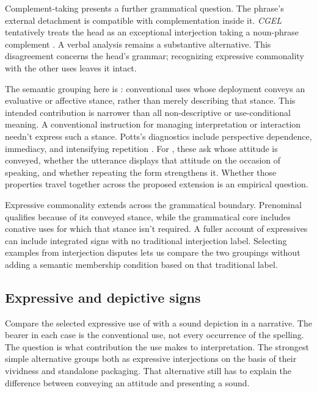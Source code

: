 \documentclass[12pt]{article}
\begin{document}
Complement-taking  presents a further
grammatical question. The phrase's external detachment is compatible with
complementation inside it. \textit{CGEL} tentatively treats the head as
an exceptional interjection taking a noun-phrase complement
\citep[1361 n.~70]{HuddlestonPullum2002}. A verbal analysis remains a
substantive alternative. This disagreement concerns the head's grammar;
recognizing expressive commonality with the other  uses
leaves it intact.

The semantic grouping here is : conventional uses
whose deployment conveys an evaluative or affective stance, rather than
merely describing that stance. This intended contribution is narrower than
all non-descriptive or use-conditional meaning. A conventional instruction
for managing interpretation or interaction needn't express such a stance.
Potts's diagnostics include perspective dependence, immediacy, and
intensifying repetition \citep[166--167]{potts2007}. For ,
these ask whose attitude is conveyed, whether the utterance displays
that attitude on the occasion of speaking, and whether repeating the
form strengthens it. Whether those properties travel together across
the proposed extension is an empirical question.

Expressive commonality extends across the grammatical boundary. Prenominal
 qualifies because of its conveyed stance, while the
grammatical core includes conative uses for which that stance isn't
required. A fuller account of expressives can include integrated signs
with no traditional interjection label. Selecting examples from interjection
disputes lets us compare the two groupings without adding a semantic
membership condition based on that traditional label.

\subsection{Expressive and depictive signs}\label{sec:expressive-depictive}

Compare the selected expressive use of  with a sound depiction
 in a narrative. The bearer in each case is the conventional
use, not every occurrence of the spelling. The question is what contribution
the use makes to interpretation. The strongest simple alternative groups
both as expressive interjections on the basis of their vividness and
standalone packaging. That alternative still has to explain the difference
between conveying an attitude and presenting a sound.
\end{document}
